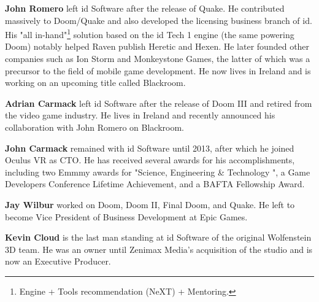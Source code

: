 \textbf{John Romero} left id Software after the release of Quake. He contributed massively to Doom/Quake and also developed the licensing business branch of id. His "all in-hand"\footnote{Engine + Tools recommendation (NeXT) + Mentoring.} solution based on the id Tech 1 engine (the same powering Doom) notably helped Raven publish Heretic and Hexen. He later founded other companies such as Ion Storm and Monkeystone Games, the latter of which was a precursor to the field of mobile game development. He now lives in Ireland and is working on an upcoming title called Blackroom.\\
\par

\textbf{Adrian Carmack} left id Software after the release of Doom III and retired from the video game industry. He lives in Ireland and recently announced his collaboration with John Romero on Blackroom.\\
\par

\textbf{John Carmack} remained with id Software until 2013, after which he joined Oculus VR as CTO. He has received several awards for his accomplishments, including two Emmmy awards for "Science, Engineering \& Technology ", a Game Developers Conference Lifetime Achievement, and a BAFTA Fellowship Award.\\
\par
\textbf{Jay Wilbur} worked on Doom, Doom II, Final Doom, and Quake. He left to become Vice President of Business Development at Epic Games.\\
\par
\textbf{Kevin Cloud} is the last man standing at id Software of the original Wolfenstein 3D team. He was an owner until Zenimax Media's acquisition of the studio and is now an Executive Producer.
\par
